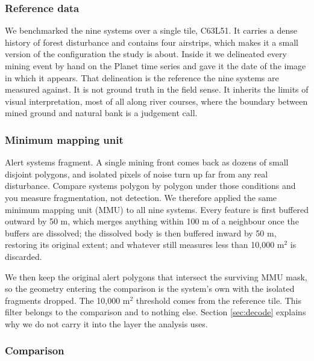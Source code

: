 \documentclass[11pt]{article}
\begin{document}

\subsubsection{Reference data}

We benchmarked the nine systems over a single tile, C63L51. It carries a dense history of forest disturbance and contains four airstrips, which makes it a small version of the configuration the study is about. Inside it we delineated every mining event by hand on the Planet time series and gave it the date of the image in which it appears. That delineation is the reference the nine systems are measured against. It is not ground truth in the field sense. It inherits the limits of visual interpretation, most of all along river courses, where the boundary between mined ground and natural bank is a judgement call.

\subsubsection{Minimum mapping unit}
\label{sec:mmu}

Alert systems fragment. A single mining front comes back as dozens of small disjoint polygons, and isolated pixels of noise turn up far from any real disturbance. Compare systems polygon by polygon under those conditions and you measure fragmentation, not detection. We therefore applied the same minimum mapping unit (MMU) to all nine systems. Every feature is first buffered outward by 50 m, which merges anything within 100 m of a neighbour once the buffers are dissolved; the dissolved body is then buffered inward by 50 m, restoring its original extent; and whatever still measures less than 10{,}000 m$^2$ is discarded.

We then keep the original alert polygons that intersect the surviving MMU mask, so the geometry entering the comparison is the system's own with the isolated fragments dropped. The 10{,}000 m$^2$ threshold comes from the reference tile. This filter belongs to the comparison and to nothing else. Section \ref{sec:decode} explains why we do not carry it into the layer the analysis uses.

\subsubsection{Comparison}
\end{document}
